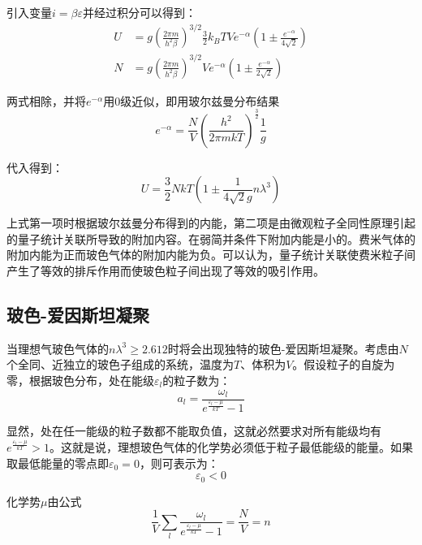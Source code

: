 \documentclass[UTF8]{ctexart}
\begin{document}
\noindent 引入变量$ i=\beta \varepsilon $并经过积分可以得到：
	\begin{equation}
	\begin{aligned}
U &=g\left(\frac{2 \pi m}{h^{2} \beta}\right)^{3 / 2} \frac{3}{2} k_{B} T V e^{-\alpha}\left(1 \pm \frac{e^{-\alpha}}{4 \sqrt{2}}\right) \\
N &=g\left(\frac{2 \pi m}{h^{2} \beta}\right)^{3 / 2} V e^{-\alpha}\left(1 \pm \frac{e^{-\alpha}}{2 \sqrt{2}}\right)
	\end{aligned}
	\end{equation}

\noindent 两式相除，并将$ e^{-\alpha} $用0级近似，即用玻尔兹曼分布结果
	\begin{equation}
 	e^{-\alpha}=\frac{N}{V} \left(\frac{h^{2}}{2 \pi m k T}\right)^{\frac{3}{2}} \frac{1}{g}
	\end{equation}

\noindent 代入得到：
	\begin{equation}
 	U=\frac{3}{2} N k T \left(1 \pm \frac{1}{4 \sqrt{2} g} n \lambda^{3}\right)
	\end{equation}

\noindent 上式第一项时根据玻尔兹曼分布得到的内能，第二项是由微观粒子全同性原理引起的量子统计关联所导致的附加内容。在弱简并条件下附加内能是小的。费米气体的附加内能为正而玻色气体的附加内能为负。可以认为，量子统计关联使费米粒子间产生了等效的排斥作用而使玻色粒子间出现了等效的吸引作用。

	\subsection{玻色-爱因斯坦凝聚}
	当理想气玻色气体的$ n \lambda^{3} \ge 2.612 $时将会出现独特的玻色-爱因斯坦凝聚。考虑由$ N $个全同、近独立的玻色子组成的系统，温度为$ T $、体积为$ V $。假设粒子的自旋为零，根据玻色分布，处在能级$ \varepsilon_{l} $的粒子数为：
	\begin{equation}
		a_{l}=\frac{\omega_{l}}{e^{\frac{\varepsilon_{l}-\mu}{k T}}-1}
	\end{equation}
	
\noindent 显然，处在任一能级的粒子数都不能取负值，这就必然要求对所有能级均有$ e^{\frac{\varepsilon_{l}-\mu}{k T}}>1 $。这就是说，理想玻色气体的化学势必须低于粒子最低能级的能量。如果取最低能量的零点即$ \varepsilon_{0}=0 $，则可表示为：
\begin{equation}
	\varepsilon_{0}<0
\end{equation}

	化学势$ \mu $由公式
	\begin{equation}
		\frac{1}{V} \sum_{l} \frac{\omega_{l}}{e^{\frac{\varepsilon_{l}-\mu}{k T}}-1}=\frac{N}{V}=n
	\end{equation}
	
\end{document}
